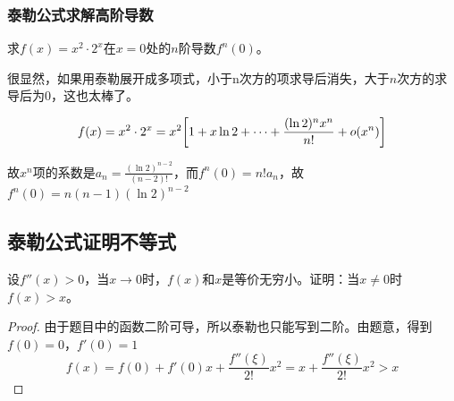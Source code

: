 \subsubsection{泰勒公式求解高阶导数}
\begin{problem}
	求$f(x)=x^2\cdot2^x$在$x=0$处的$n$阶导数$f^n(0)$。
	\begin{solution}
		很显然，如果用泰勒展开成多项式，小于n次方的项求导后消失，大于$n$次方的求导后为0，这也太棒了。
		
		$$f(x)=x^2\cdot2^x=x^2\qty[1+x\ln2+\cdots+\frac{(\ln2)^nx^n}{n!}+o(x^n)]$$
		
		故$x^n$项的系数是$a_n=\frac{(\ln2)^{n-2}}{(n-2)!}$，而$f^n(0)=n!a_n$，故$f^n(0)=n(n-1)(\ln2)^{n-2}$
	\end{solution}
\end{problem}

\subsection{泰勒公式证明不等式}
\begin{problem}
    设$f''(x)>0$，当$x\rightarrow 0$时，$f(x)$和$x$是等价无穷小。证明：当$x\neq 0$时$f(x)>x$。
	\begin{proof}
		由于题目中的函数二阶可导，所以泰勒也只能写到二阶。由题意，得到$f(0)=0$，$f'(0)=1$
		$$f(x)=f(0)+f'(0)x+\frac{f''(\xi)}{2!}x^2=x+\frac{f''(\xi)}{2!}x^2>x$$
	\end{proof}
\end{problem}